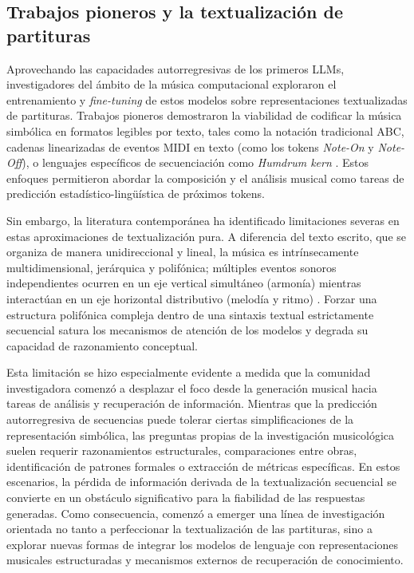 \subsection{Trabajos pioneros y la textualización de partituras}
Aprovechando las capacidades autorregresivas de los primeros LLMs, investigadores del ámbito de la música computacional exploraron el entrenamiento y \textit{fine-tuning} de estos modelos sobre representaciones textualizadas de partituras. Trabajos pioneros demostraron la viabilidad de codificar la música simbólica en formatos legibles por texto, tales como la notación tradicional ABC, cadenas linearizadas de eventos MIDI en texto (como los tokens \textit{Note-On} y \textit{Note-Off}), o lenguajes específicos de secuenciación como \textit{Humdrum kern} \citep{sturm2016music, oore2020this}. Estos enfoques permitieron abordar la composición y el análisis musical como tareas de predicción estadístico-lingüística de próximos tokens. 

Sin embargo, la literatura contemporánea ha identificado limitaciones severas en estas aproximaciones de textualización pura. A diferencia del texto escrito, que se organiza de manera unidireccional y lineal, la música es intrínsecamente multidimensional, jerárquica y polifónica; múltiples eventos sonoros independientes ocurren en un eje vertical simultáneo (armonía) mientras interactúan en un eje horizontal distributivo (melodía y ritmo) \citep{zhao2023comprehensive}. Forzar una estructura polifónica compleja dentro de una sintaxis textual estrictamente secuencial satura los mecanismos de atención de los modelos y degrada su capacidad de razonamiento conceptual.

Esta limitación se hizo especialmente evidente a medida que la comunidad investigadora comenzó a desplazar el foco desde la generación musical hacia tareas de análisis y recuperación de información. Mientras que la predicción autorregresiva de secuencias puede tolerar ciertas simplificaciones de la representación simbólica, las preguntas propias de la investigación musicológica suelen requerir razonamientos estructurales, comparaciones entre obras, identificación de patrones formales o extracción de métricas específicas. En estos escenarios, la pérdida de información derivada de la textualización secuencial se convierte en un obstáculo significativo para la fiabilidad de las respuestas generadas. Como consecuencia, comenzó a emerger una línea de investigación orientada no tanto a perfeccionar la textualización de las partituras, sino a explorar nuevas formas de integrar los modelos de lenguaje con representaciones musicales estructuradas y mecanismos externos de recuperación de conocimiento.

